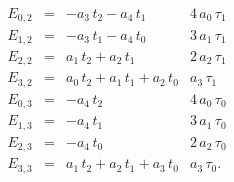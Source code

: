 

\[
\begin{array}{rcl|r}
E_{0,2} &=& - a_3\,t_2 - a_4\,t_1 & 4\,a_0\,\tau_1 \\
E_{1,2} &=& - a_3\,t_1 - a_4\,t_0 & 3\,a_1\,\tau_1 \\
E_{2,2} &=& a_1\,t_2 + a_2\,t_1 & 2\,a_2\,\tau_1 \\
E_{3,2} &=& a_0\,t_2 + a_1\,t_1 + a_2\,t_0 & a_3\,\tau_1 \\
\hline
E_{0,3} &=& - a_4\,t_2 & 4\,a_0\,\tau_0 \\
E_{1,3} &=& - a_4\,t_1 & 3\,a_1\,\tau_0 \\
E_{2,3} &=& - a_4\,t_0 & 2\,a_2\,\tau_0 \\
E_{3,3} &=& a_1\,t_2 + a_2\,t_1 + a_3\,t_0 & a_3\,\tau_0.
\end{array}
\]

